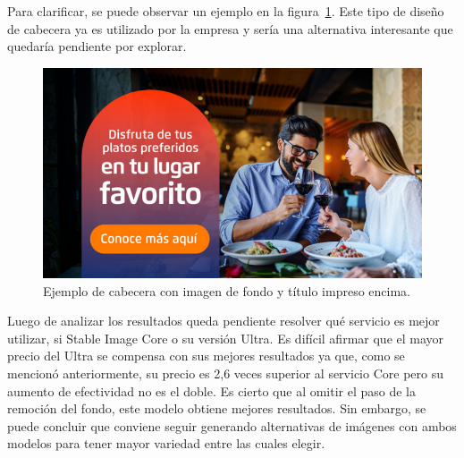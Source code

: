Para clarificar, se puede observar un ejemplo en la figura~\ref{fig:cabeceraAlternativa}. Este tipo de diseño de cabecera ya es utilizado por la empresa y sería una alternativa interesante que quedaría pendiente por explorar.

\begin{figure}[H]
    \centering
    \includegraphics[width=0.8\linewidth]{Figures/cabeceraAlternativa.png}
    \caption{Ejemplo de cabecera con imagen de fondo y título impreso encima.}
    \label{fig:cabeceraAlternativa}
\end{figure}

Luego de analizar los resultados queda pendiente resolver qué servicio es mejor utilizar, si Stable Image Core o su versión Ultra. Es difícil afirmar que el mayor precio del Ultra se compensa con sus mejores resultados ya que, como se mencionó anteriormente, su precio es 2,6 veces superior al servicio Core pero su aumento de efectividad no es el doble. Es cierto que al omitir el paso de la remoción del fondo, este modelo obtiene mejores resultados. Sin embargo, se puede concluir que conviene seguir generando alternativas de imágenes con ambos modelos para tener mayor variedad entre las cuales elegir.
